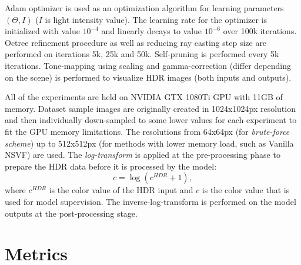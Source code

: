 Adam optimizer is used as an optimization algorithm for learning parameters $(\Theta, I)$ ($I$ is light intensity value).
The learning rate for the optimizer is initialized with value $10^{-4}$
and linearly decays to value $10^{-6}$ over 100k iterations.
Octree refinement procedure as well as reducing ray casting step size are performed on iterations 5k, 25k and 50k.
Self-pruning is performed every 5k iterations.
Tone-mapping using scaling and gamma-correction (differ depending on the scene)
is performed to visualize HDR images (both inputs and outputs).

All of the experiments are held on NVIDIA GTX 1080Ti GPU with 11GB of memory.
Dataset sample images are originally created in 1024x1024px resolution
and then individually down-sampled to some lower values for each experiment to fit the GPU memory limitations.
The resolutions from 64x64px (for \textit{brute-force scheme}) up to 512x512px 
(for methods with lower memory load, such as Vanilla NSVF) are used.
The \textit{log-transform} is applied at the pre-processing phase
to prepare the HDR data before it is processed by the model:
\begin{equation}
    c = \log (c^{HDR} + 1),
\end{equation}
where $c^{HDR}$ is the color value of the HDR input
and $c$ is the color value that is used for model supervision.
The inverse-log-transform is performed on the model outputs at the post-processing stage.









\section{Metrics}
\label{sec:metrics}

